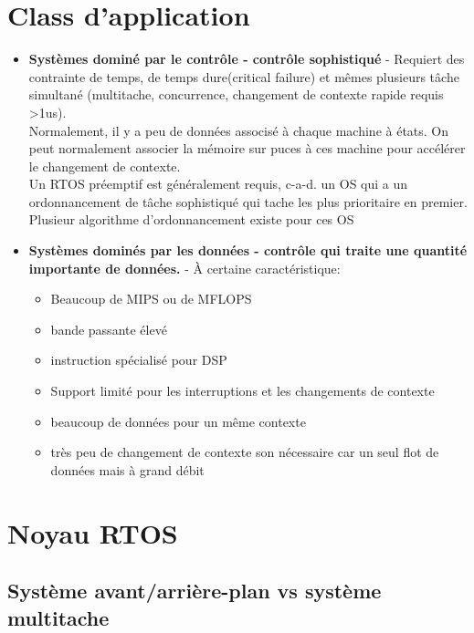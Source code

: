 \documentclass[oneside]{book}
\begin{document}
    \section{Class d'application}
    \begin{itemize}
        \item \textbf{Systèmes dominé par le contrôle - contrôle sophistiqué} - Requiert des contrainte de temps, de temps dure(critical failure) et mêmes plusieurs tâche simultané (multitache, concurrence, changement de contexte rapide requis >1us).\\
        
        Normalement, il y a peu de données associsé à chaque machine à états. On peut normalement associer la mémoire sur puces à ces machine pour accélérer le changement de contexte.\\
        
        Un RTOS préemptif est généralement requis, c-a-d. un OS qui a un ordonnancement de tâche sophistiqué qui tache les plus prioritaire en premier. Plusieur algorithme d'ordonnancement existe pour ces OS\\
        
        \item \textbf{Systèmes dominés par les données - contrôle qui traite une quantité importante de données.} - À certaine caractéristique:
        \begin{itemize}
            \item Beaucoup de MIPS ou de MFLOPS
            \item bande passante élevé
            \item instruction spécialisé pour DSP
            \item Support limité pour les interruptions et les changements de contexte
            \item beaucoup de données pour un même contexte
            \item très peu de changement de contexte son nécessaire car un seul flot de données mais à grand débit
        \end{itemize}
    \end{itemize}
    
    \section{Noyau RTOS}
    \subsection{Système avant/arrière-plan vs système multitache}
\end{document}
